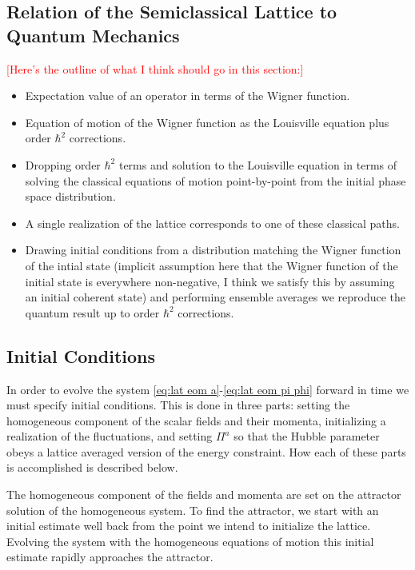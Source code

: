 \subsection{Relation of the Semiclassical Lattice to Quantum Mechanics}
\textcolor{red}{[Here's the outline of what I think should go in this section:]}
\begin{itemize}
  \color{red}
  \item Expectation value of an operator in terms of the Wigner function.
  \item Equation of motion of the Wigner function as the Louisville equation plus order $\hbar^2$ corrections.
  \item Dropping order $\hbar^2$ terms and solution to the Louisville equation in terms of solving the classical equations of motion point-by-point from the initial phase space distribution.
  \item A single realization of the lattice corresponds to one of these classical paths.
  \item Drawing initial conditions from a distribution matching the Wigner function of the intial state (implicit assumption here that the Wigner function of the initial state is everywhere non-negative, I think we satisfy this by assuming an initial coherent state) and performing ensemble averages we reproduce the quantum result up to order $\hbar^2$ corrections.
\end{itemize}
  
\subsection{Initial Conditions} \label{sec:ICs}
In order to evolve the system \eqref{eq:lat eom a}-\eqref{eq:lat eom pi phi} forward in time we must specify initial conditions. This is done in three parts: setting the homogeneous component of the scalar fields and their momenta, initializing a realization of the fluctuations, and setting $\Pi^a$ so that the Hubble parameter obeys a lattice averaged version of the energy constraint. How each of these parts is accomplished is described below.

The homogeneous component of the fields and momenta are set on the attractor solution of the homogeneous system. To find the attractor, we start with an initial estimate well back from the point we intend to initialize the lattice. Evolving the system with the homogeneous equations of motion this initial estimate rapidly approaches the attractor.

